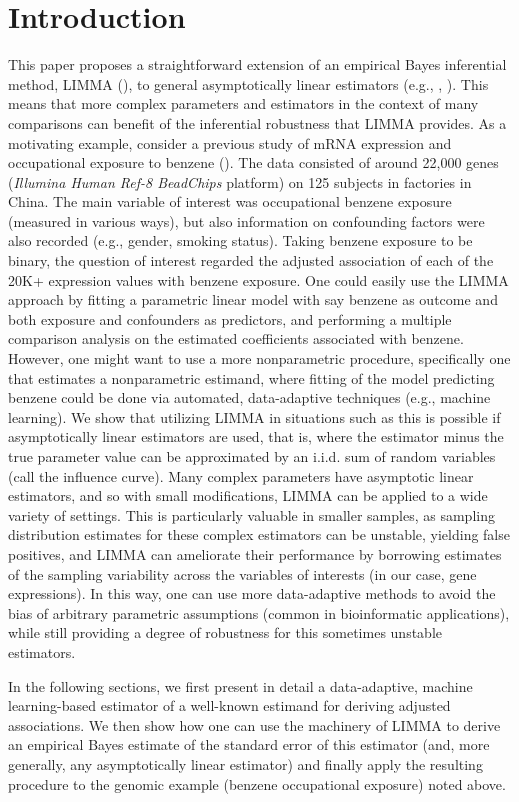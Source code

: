 \chapter{Introduction}

This paper proposes a straightforward extension of an empirical Bayes
inferential method, LIMMA (\cite{smyth2004linear}), to general asymptotically
linear estimators (e.g., \cite{tsiatis2007semiparametric},
\cite{van2011targeted}). This means that more complex parameters and estimators
in the context of many comparisons can benefit of the inferential robustness
that LIMMA provides. As a motivating example, consider a previous study of mRNA
expression and occupational exposure to benzene (\cite{mchale2011global}). The
data consisted of around 22,000 genes (\textit{Illumina Human Ref-8 BeadChips}
platform) on 125  subjects in factories in China. The main variable of interest
was occupational benzene exposure (measured in various ways), but also
information on confounding factors were also recorded (e.g., gender, smoking
status). Taking benzene exposure to be binary, the question of interest regarded
the adjusted association of each of the 20K+ expression values with benzene
exposure. One could easily use the LIMMA approach by fitting a parametric linear
model with say benzene as outcome and both exposure and confounders as
predictors, and performing a multiple comparison analysis on the estimated
coefficients associated with benzene. However, one might want to use a more
nonparametric procedure, specifically one that estimates a nonparametric
estimand, where fitting of the model predicting benzene could be done via
automated, data-adaptive techniques (e.g., machine learning). We show that
utilizing LIMMA in situations such as this is possible if asymptotically linear
estimators are used, that is, where the estimator minus the true parameter value
can be approximated by an i.i.d. sum of random variables (call the influence
curve). Many complex parameters have asymptotic linear estimators, and so with
small modifications, LIMMA can be applied to a wide variety of settings. This is
particularly valuable in smaller samples, as sampling distribution estimates for
these complex estimators can be unstable, yielding false positives, and LIMMA
can ameliorate their performance by borrowing estimates of the sampling
variability across the variables of interests (in our case, gene expressions).
In this way, one can use more data-adaptive methods to avoid the bias of
arbitrary parametric assumptions (common in bioinformatic applications), while
still providing a degree of robustness for this sometimes unstable estimators.

In the following sections, we first present in detail a data-adaptive, machine
learning-based estimator of a well-known estimand for deriving adjusted
associations. We then show how one can use the machinery of LIMMA to derive an
empirical Bayes estimate of the standard error of this estimator (and, more
generally, any asymptotically linear estimator) and finally apply the resulting
procedure to the genomic example (benzene occupational exposure) noted above.
